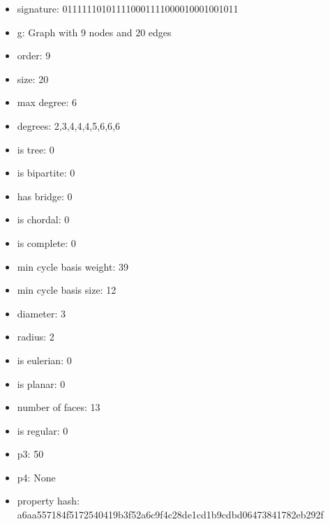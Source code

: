 \newpage
\begin{figure}
\end{figure}
\begin{itemize}
\item signature: 011111101011110001111000010001001011
\item g: Graph with 9 nodes and 20 edges
\item order: 9
\item size: 20
\item max degree: 6
\item degrees: 2,3,4,4,4,5,6,6,6
\item is tree: 0
\item is bipartite: 0
\item has bridge: 0
\item is chordal: 0
\item is complete: 0
\item min cycle basis weight: 39
\item min cycle basis size: 12
\item diameter: 3
\item radius: 2
\item is eulerian: 0
\item is planar: 0
\item number of faces: 13
\item is regular: 0
\item p3: 50
\item p4: None
\item property hash: a6aa557184f5172540419b3f52a6c9f4c28de1cd1b9cdbd06473841782eb292f
\end{itemize}
